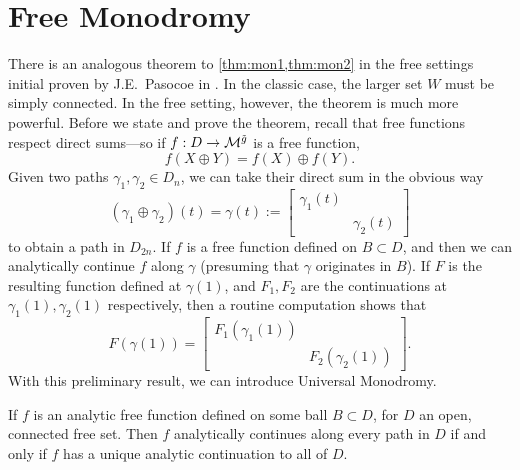 \section{Free Monodromy}%
\label{sec:freemono}

There is an analogous theorem to \cref{thm:mon1,thm:mon2} in the free settings
initial proven by J.E.\ Pasocoe in \cite{pascoeNoncommutative2020}.
In the classic case, the larger set \(W\) must be simply connected. In the free
setting, however, the theorem is much more powerful. Before we state and prove
the theorem, recall that free functions respect direct sums---so if
\(f: D\to \mathcal{M}^{\tilde{g}} \) is a free function,
\[
  f(X \oplus Y ) = f(X) \oplus f(Y).
\]
Given two paths \(\gamma_1, \gamma_2 \in D_n\), we can take their direct sum in
the obvious way
\[
  (\gamma_1\oplus\gamma_2 )(t) = \gamma(t) := \begin{bmatrix} \gamma_1(t) & \\& \gamma_2(t) \end{bmatrix}
\]
to obtain a path in \(D_{2n}\). If \(f\) is a free function defined on
\(B \subset D\), and then we can analytically continue \(f\) along \(\gamma\)
(presuming that \(\gamma\) originates in \(B\)). If \(F\) is the resulting
function defined at \(\gamma(1)\), and \(F_1,F_2\) are the continuations at
\(\gamma_1(1), \gamma_2(1)\) respectively, then a routine computation shows that
\[
  F(\gamma(1)) = \begin{bmatrix} F_1(\gamma_1(1)) & \\& F_2(\gamma_2(1))\end{bmatrix} .
\]
With this preliminary result, we can introduce Universal Monodromy.
\begin{theorem}%
  \label{thm:freemono}
  If \(f\) is an analytic free function defined on some ball \(B \subset D\),
  for \(D\) an open, connected free set.
  Then \(f\) analytically continues along every path in \(D\) if and only if
  \(f\) has a unique analytic continuation to all of \(D\).
\end{theorem}

